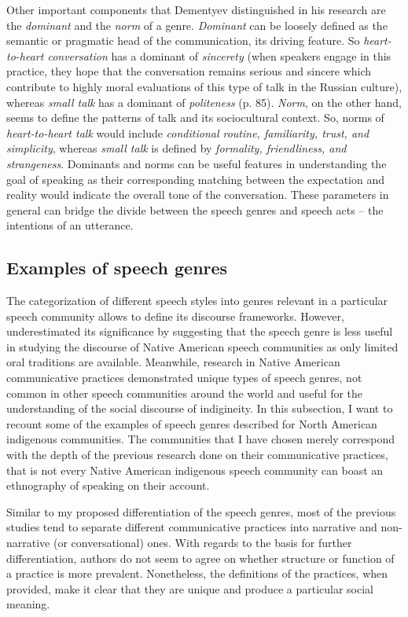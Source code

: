\documentclass[12pt]{article}
\begin{document}
Other important components that Dementyev distinguished in his research are the \textit{dominant} and the \textit{norm} of a genre. \textit{Dominant} can be loosely defined as the semantic or pragmatic head of the communication, its driving feature. So \textit{heart-to-heart conversation} has a dominant of \textit{sincerety} (when speakers engage in this practice, they hope that the conversation remains serious and sincere which contribute to highly moral evaluations of this type of talk in the Russian culture), whereas \textit{small talk} has a dominant of \textit{politeness} (p. 85). \textit{Norm}, on the other hand, seems to define the patterns of talk and its sociocultural context. So, norms of \textit{heart-to-heart talk} would include \textit{conditional routine, familiarity, trust, and simplicity}, whereas \textit{small talk} is defined by \textit{formality, friendliness, and strangeness}. Dominants and norms can be useful features in understanding the goal of speaking as their corresponding matching between the expectation and reality would indicate the overall tone of the conversation. These parameters in general can bridge the divide between the speech genres and speech acts -- the intentions of an utterance. 
\subsection{Examples of speech genres}
The categorization of different speech styles into genres relevant in a particular speech community allows to define its discourse frameworks. However, \textcite[p. 102]{dementyev2015} underestimated its significance by suggesting that the speech genre is less useful in studying the discourse of Native American speech communities as only limited oral traditions are available. Meanwhile, research in Native American communicative practices demonstrated unique types of speech genres, not common in other speech communities around the world and useful for the understanding of the social discourse of indigineity. In this subsection, I want to recount some of the examples of speech genres described for North American indigenous communities. The communities that I have chosen merely correspond with the depth of the previous research done on their communicative practices, that is not every Native American indigenous speech community can boast an ethnography of speaking on their account.

Similar to my proposed differentiation of the speech genres, most of the previous studies tend to separate different communicative practices into narrative and non-narrative (or conversational) ones. With regards to the basis for further differentiation, authors do not seem to agree on whether structure or function of a practice is more prevalent. Nonetheless, the definitions of the practices, when provided, make it clear that they are unique and produce a particular social meaning. 
\end{document}
